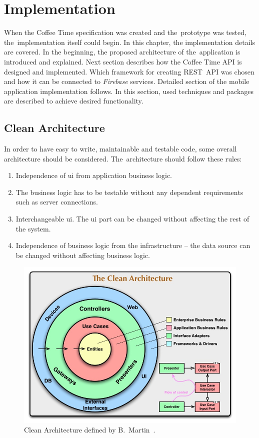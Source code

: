 \chapter{Implementation}
\label{ch:implementation}
When the Coffee Time specification was created and the~prototype was tested, the~implementation itself could begin. In this chapter, the implementation details are covered. In the beginning, the proposed architecture of the~application is introduced and explained. Next section describes how the Coffee Time API is designed and implemented. Which framework for creating REST~API was chosen and how it can be connected to \textit{Firebase} services. Detailed section of the mobile application implementation follows. In this section, used techniques and packages are described to achieve desired functionality. 
\section{Clean Architecture}
In order to have easy to write, maintainable and testable code, some overall architecture should be considered. The~architecture should follow these rules: 
\begin{enumerate}
\item Independence of \gls{ui} from application business logic. 
\item The business logic has to be testable without any dependent requirements such as server connections.
\item Interchangeable \gls{ui}. The \gls{ui} part can be changed without affecting the rest of the system.
\item Independence of business logic from the infrastructure -- the data source can be changed without affecting business logic.
\end{enumerate}

\begin{figure}[ht]
    \centering
    \includegraphics[width=0.75\linewidth]{img/implementation/CleanArchitecture.jpg}
    \caption{Clean Architecture defined by B.~Martin~\cite{clean-architecture-article}.}
    \label{fig:clean-arch-bmartin}
\end{figure}


